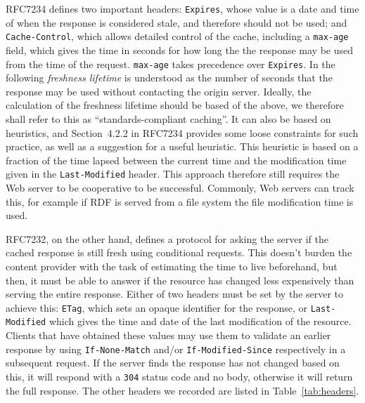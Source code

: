 \documentclass{llncs}
\newcommand{\httph}[1]{\texttt{#1}}
\begin{document}
RFC7234 defines two important headers: \httph{Expires}, whose value is
a date and time of when the response is considered stale, and
therefore should not be used; and \httph{Cache-Control}, which allows
detailed control of the cache, including a \httph{max-age} field,
which gives the time in seconds for how long the the response may be
used from the time of the request. \httph{max-age} takes precedence
over \httph{Expires}. In the following \emph{freshness lifetime} is
understood as the number of seconds that the response may be used
without contacting the origin server. Ideally, the calculation of the
freshness lifetime should be based of the above, we therefore shall
refer to this as ``standards-compliant caching''. It can also
be based on heuristics, and Section~4.2.2 in RFC7234 provides some loose
constraints for such practice, as well as a suggestion for a useful
heuristic. This heuristic is based on a fraction of the time lapsed
between the current time and the modification time given in the
\httph{Last-Modified} header. This approach therefore still requires
the Web server to be cooperative to be successful. Commonly, Web
servers can track this, for example if RDF is served from a file
system the file modification time is used.

RFC7232, on the other hand, defines a protocol for asking the server
if the cached response is still fresh using conditional requests. This
doesn't burden the content provider with the task of estimating the
time to live beforehand, but then, it must be able to answer if the
resource has changed less expensively than serving the entire
response. Either of two headers must be set by the server to achieve
this: \httph{ETag}, which sets an opaque identifier for the response,
or \httph{Last-Modified} which gives the time and date of the last
modification of the resource. Clients that have obtained these values
may use them to validate an earlier response by using
\httph{If-None-Match} and/or \httph{If-Modified-Since} respectively in
a subsequent request. If the server finds the response has not changed
based on this, it will respond with a \httph{304} status code and no
body, otherwise it will return the full response. The other headers we
recorded are listed in Table~\ref{tab:headers}.
\end{document}
